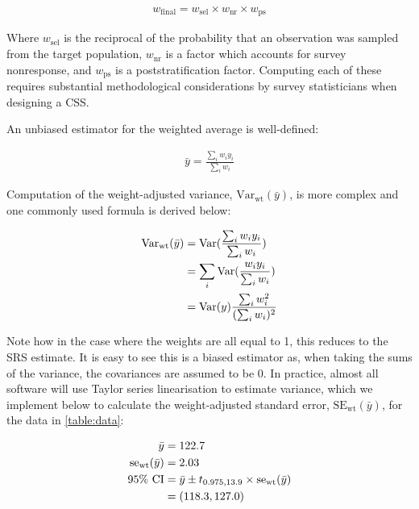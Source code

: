 \begin{align}
\label{eq:final-wt}
w_{\text{final}} = w_{\text{sel}} \times w_{\text{nr}} \times w_{\text{ps}}
\end{align}

Where $w_{\text{sel}}$ is the reciprocal of the probability that an observation was sampled from the target population, $w_{\text{nr}}$ is a factor which accounts for survey nonresponse, and $w_{\text{ps}}$ is a poststratification factor. Computing each of these requires substantial methodological considerations by survey statisticians when designing a CSS. 

An unbiased estimator for the weighted average is well-defined:

\begin{align}
\label{eq:wt-mean}
\bar{y}	=	\frac{ \sum_{i} w_{i} y_{i} }{ \sum_{i} w_{i} }
\end{align}

Computation of the weight-adjusted variance, $\text{Var}_{\text{wt}}(\bar{y})$, is more complex and one commonly used formula is derived below:

\begin{align}
\label{eq:wt-var}
\text{Var}_{\text{wt}}(\bar{y})	&=	\text{Var}(\frac{ \sum_{i} w_{i} y_{i} }{ \sum_{i} w_{i} })			\\
\notag
						&=	\sum_{i} \text{Var}(\frac{ w_{i} y_{i} }{ \sum_{i} w_{i} })			\\
\notag
						&=	\text{Var}(y) \frac{ \sum_{i} w_{i}^{2} }{ (\sum_{i} w_{i})^{2} }
\end{align}

Note how in the case where the weights are all equal to 1, this reduces to the SRS estimate. It is easy to see this is a biased estimator as, when taking the sums of the variance, the covariances are assumed to be 0. In practice, almost all software will use Taylor series linearisation to estimate variance, which we implement below to calculate the weight-adjusted standard error, $\text{SE}_{\text{wt}}(\bar{y})$, for the data in \autoref{table:data}:

\begin{align}
\label{eq:wt-stats}
\bar{y}					&=		122.7												\\
\notag
\text{se}_{\text{wt}}(\bar{y})	&=		2.03												\\
\notag
95\%\text{ CI}				&=		\bar{y} \pm t_{0.975, 13.9} \times \text{se}_{\text{wt}}(\bar{y})	\\
\notag
						&=		(118.3, 127.0)
\end{align}

